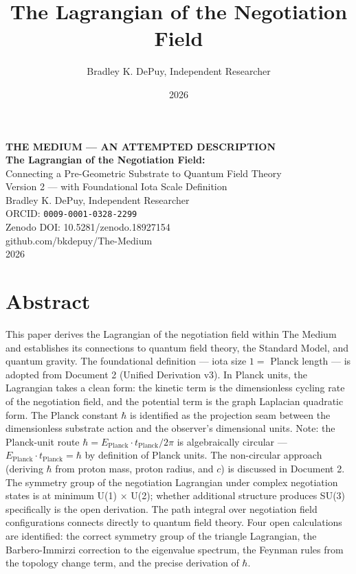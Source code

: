 \documentclass[11pt,letterpaper]{article}
\author{Bradley K. DePuy, Independent Researcher}
\date{2026}
\title{The Lagrangian of the Negotiation Field}
\begin{document}
\pagestyle{plain}
\begin{titlepage}
\vspace*{3cm}
\begin{center}
  {\large\bfseries THE MEDIUM --- AN ATTEMPTED DESCRIPTION}\\[1em]
  {\LARGE\bfseries The Lagrangian of the Negotiation Field:}\\[0.4em]
  {\large Connecting a Pre-Geometric Substrate to Quantum Field Theory}\\[0.3em]
  {\normalsize Version 2 --- with Foundational Iota Scale Definition}\\[2em]
  {\normalsize Bradley K. DePuy, Independent Researcher}\\[0.4em]
  {\normalsize ORCID: \texttt{0009-0001-0328-2299}}\\[0.4em]
  {\normalsize Zenodo DOI: 10.5281/zenodo.18927154}\\[0.4em]
  {\normalsize github.com/bkdepuy/The-Medium}\\[0.4em]
  {\normalsize 2026}
\end{center}
\end{titlepage}
\pagestyle{body}

\section{Abstract}
\label{sec:org9458480}

This paper derives the Lagrangian of the negotiation field within The Medium and establishes its connections to quantum field theory, the Standard Model, and quantum gravity. The foundational definition --- iota size \(1 =\) Planck length --- is adopted from Document 2 (Unified Derivation v3). In Planck units, the Lagrangian takes a clean form: the kinetic term is the dimensionless cycling rate of the negotiation field, and the potential term is the graph Laplacian quadratic form. The Planck constant \(\hbar\) is identified as the projection seam between the dimensionless substrate action and the observer's dimensional units. Note: the Planck-unit route \(\hbar = E_\text{Planck} \cdot t_\text{Planck}/2\pi\) is algebraically circular --- \(E_\text{Planck} \cdot t_\text{Planck} = \hbar\) by definition of Planck units. The non-circular approach (deriving \(\hbar\) from proton mass, proton radius, and \(c\)) is discussed in Document 2. The symmetry group of the negotiation Lagrangian under complex negotiation states is at minimum U(1) × U(2); whether additional structure produces SU(3) specifically is the open derivation. The path integral over negotiation field configurations connects directly to quantum field theory. Four open calculations are identified: the correct symmetry group of the triangle Lagrangian, the Barbero-Immirzi correction to the eigenvalue spectrum, the Feynman rules from the topology change term, and the precise derivation of \(\hbar\).
\end{document}
